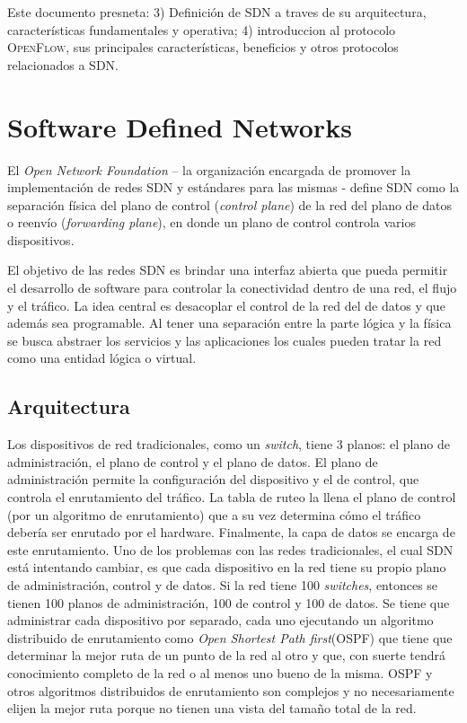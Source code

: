 \documentclass[10pt,journal,compsoc]{IEEEtran}
\begin{document}
Este documento presneta: 3) Definición de SDN a traves de su arquitectura, características fundamentales y operativa; 4) introduccion al protocolo \textsc{OpenFlow}, sus principales características, beneficios y otros protocolos relacionados a SDN.  

\section{Software Defined Networks}

El \textit{Open Network Foundation} -- la organización encargada de promover la implementación de redes SDN y estándares para las mismas - define SDN como la separación física del plano de control (\emph{control plane}) de la red del plano de datos o reenvío (\emph{forwarding plane}), en donde un plano de control controla varios dispositivos\cite{onf}. 

El objetivo de las redes SDN es brindar una interfaz abierta que pueda permitir el desarrollo de software para controlar la conectividad dentro de una red, el flujo y el tráfico.
La idea central es desacoplar el control de la red del de datos y que además sea programable. Al tener una separación entre la parte lógica y la física se busca abstraer los servicios y las aplicaciones los cuales pueden tratar la red como una entidad lógica o virtual. 


\subsection{Arquitectura}
Los dispositivos de red tradicionales, como un \emph{switch}, tiene 3 planos: el plano de administración, el plano de control y el plano de datos. El plano de administración permite la configuración del dispositivo y el de control, que controla el enrutamiento del tráfico. La tabla de ruteo la llena el plano de control (por un algoritmo de enrutamiento) que a su vez determina cómo el tráfico debería ser enrutado por el hardware. Finalmente, la capa de datos se encarga de este enrutamiento. Uno de los problemas con las redes tradicionales, el cual SDN está intentando cambiar, es que cada dispositivo en la red tiene su propio plano de administración, control y de datos. Si la red tiene 100 \emph{switches}, entonces se tienen 100 planos de administración, 100 de control y 100 de datos. Se tiene que administrar cada dispositivo por separado, cada uno ejecutando un algoritmo distribuido de enrutamiento como \emph{Open Shortest Path first}(OSPF) que tiene que determinar la mejor ruta de un punto de la red al otro y que, con suerte tendrá conocimiento completo de la red o al menos uno bueno de la misma. OSPF y otros algoritmos distribuidos de enrutamiento son complejos y no necesariamente elijen la mejor ruta porque no tienen una vista del tamaño total de la red. 
\end{document}

